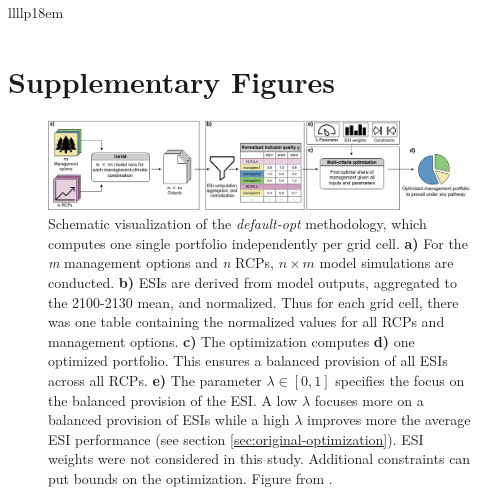 \documentclass[]{article}
\begin{document}
\begin{table}[h!]
\begin{tabular}{llllp{18em}}
		\hline
		
		
	\end{tabular}
\end{table}














\section{Supplementary Figures}



\begin{figure}[!h]
	\includegraphics[width=\linewidth]{supplement_figs/optimization.png}
	\caption{Schematic visualization of the \textit{default-opt} methodology, which computes one single portfolio independently per grid cell. 
		\textbf{a)} For the \textit{m} management options and \textit{n} RCPs, $n\times m$ model simulations are conducted. 
		\textbf{b)} ESIs are derived from model outputs, aggregated to the 2100-2130 mean, and normalized. Thus for each grid cell, there was one table containing the normalized values for all RCPs and management options. 
		\textbf{c)} The optimization computes \textbf{d)} one optimized portfolio. This ensures a balanced provision of all ESIs across all RCPs. 
		\textbf{e)} The parameter $\lambda \in [0, 1]$ specifies the focus on the balanced provision of the ESI. A low $\lambda$ focuses more on a balanced provision of ESIs while a high $\lambda$ improves more the average ESI performance (see section \ref{sec:original-optimization}). ESI weights were not considered in this study. Additional constraints can put bounds on the optimization. Figure from \textcite{Gregor2022}.
	}
	\label{fig:optimization}
\end{figure}
\end{document}
